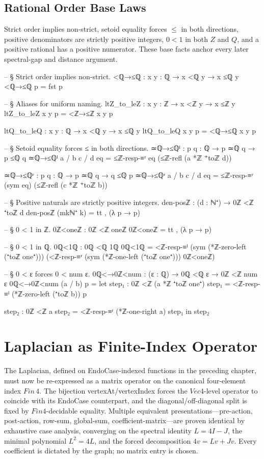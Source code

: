 \documentclass[11pt,a4paper]{book}
\def\mathrm#1{#1}%
\def\mathbb#1{#1}%
\def\texttt#1{#1}%
\begin{document}
\section{Rational Order Base Laws}

Strict order implies non-strict, setoid equality forces $\le$ in both directions, positive denominators are strictly positive integers, $0 < 1$ in both $\mathbb{Z}$ and $\mathbb{Q}$, and a positive rational has a positive numerator.
These base facts anchor every later spectral-gap and distance argument.

\begin{code}
-- § Strict order implies non-strict.
<ℚ→≤ℚ : {x y : ℚ} → x <ℚ y → x ≤ℚ y
<ℚ→≤ℚ p = fst p

-- § Aliases for uniform naming.
ltZ_to_leZ : {x y : ℤ} → x <ℤ y → x ≤ℤ y
ltZ_to_leZ {x} {y} p = <ℤ→≤ℤ {x} {y} p

ltQ_to_leQ : {x y : ℚ} → x <ℚ y → x ≤ℚ y
ltQ_to_leQ {x} {y} p = <ℚ→≤ℚ {x} {y} p

-- § Setoid equality forces ≤ in both directions.
≃ℚ→≤ℚˡ : {p q : ℚ} → p ≃ℚ q → p ≤ℚ q
≃ℚ→≤ℚˡ {a / b} {c / d} eq =
  ≤ℤ-resp-≡ʳ eq (≤ℤ-refl (a *ℤ ⁺toℤ d))

≃ℚ→≤ℚʳ : {p q : ℚ} → p ≃ℚ q → q ≤ℚ p
≃ℚ→≤ℚʳ {a / b} {c / d} eq =
  ≤ℤ-resp-≡ʳ (sym eq) (≤ℤ-refl (c *ℤ ⁺toℤ b))

-- § Positive naturals are strictly positive integers.
den-posℤ : (d : ℕ⁺) → 0ℤ <ℤ ⁺toℤ d
den-posℤ (mkℕ⁺ k) =
  tt , (λ p → p)

-- § 0 < 1 in ℤ.
0ℤ<oneℤ : 0ℤ <ℤ oneℤ
0ℤ<oneℤ =
  tt , (λ p → p)

-- § 0 < 1 in ℚ.
0ℚ<1ℚ : 0ℚ <ℚ 1ℚ
0ℚ<1ℚ =
  <ℤ-resp-≡ˡ (sym (*ℤ-zero-left (⁺toℤ one⁺)))
    (<ℤ-resp-≡ʳ (sym (*ℤ-one-left (⁺toℤ one⁺)))
      0ℤ<oneℤ)

-- § 0 < ε forces 0 < num ε.
0ℚ<→0ℤ<num : (ε : ℚ) → 0ℚ <ℚ ε → 0ℤ <ℤ num ε
0ℚ<→0ℤ<num (a / b) p =
  let step₁ : 0ℤ <ℤ (a *ℤ ⁺toℤ one⁺)
      step₁ = <ℤ-resp-≡ˡ (*ℤ-zero-left (⁺toℤ b)) p

      step₂ : 0ℤ <ℤ a
      step₂ = <ℤ-resp-≡ʳ (*ℤ-one-right a) step₁
  in
  step₂
\end{code}

\chapter{Laplacian as Finite-Index Operator}

The Laplacian, defined on \texttt{EndoCase}-indexed functions in the preceding chapter, must now be re-expressed as a matrix operator on the canonical four-element index $\mathrm{Fin}\,4$. The bijection \texttt{vertexAt}/\texttt{vertexIndex} forces the $\mathrm{Vec4}$-level operator to coincide with its \texttt{EndoCase} counterpart, and the diagonal/off-diagonal split is fixed by $\mathrm{Fin4}$-decidable equality. Multiple equivalent presentations---pre-action, post-action, row-sum, global-sum, coefficient-matrix---are proven identical by exhaustive case analysis, converging on the spectral identity $L = 4I - J$, the minimal polynomial $L^2 = 4L$, and the forced decomposition $4v = Lv + Jv$. Every coefficient is dictated by the graph; no matrix entry is chosen.
\end{document}

